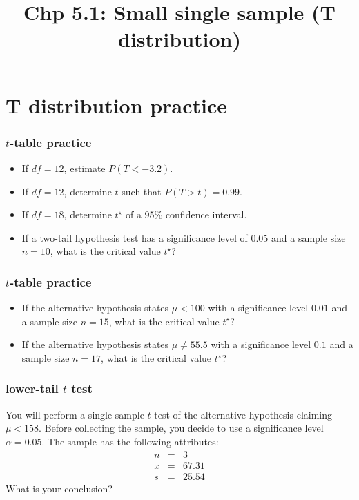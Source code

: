 \documentclass[11pt,containsverbatim,handout]{beamer}
\title[Chp 5.1: Small single sample (T distribution)]{Chp 5.1: Small single sample (T distribution)}
\newcommand{\soln}[1]{ }
\begin{document}
\section{T distribution practice}
\begin{frame}
\frametitle{$t$-table practice}
\begin{itemize}
\item If $df=12$, estimate $P(T<-3.2)$.\pause
\soln{$$0.0025 ~~<~~ P(T<-3.2) ~~<~~ 0.005$$} \pause
\vfill
\item If $df=12$, determine $t$ such that $P(T>t)=0.99$.\pause
\soln{$$t = -2.68$$} \pause
\vfill
\item If $df=18$, determine $t^\star$ of a 95\% confidence interval.\pause
\soln{$$t^\star = 2.10$$} \pause
\vfill
\item If a two-tail hypothesis test has a significance level of 0.05 and a sample size $n=10$, what is the critical value $t^\star$?\pause
\soln{$$t^\star = 2.26$$}
\vfill
\end{itemize}
\end{frame}

\begin{frame}
\frametitle{$t$-table practice}
\begin{itemize}
\item If the alternative hypothesis states $\mu<100$ with a significance level $0.01$ and a sample size $n=15$, what is the critical value $t^\star$?\pause
\soln{$$t^\star = -2.62$$
An observed test statistic $t_\text{obs}$ less than $-2.62$ will cause us to reject the null.
} \pause
\vfill
\item If the alternative hypothesis states $\mu\ne 55.5$ with a significance level $0.1$ and a sample size $n=17$, what is the critical value $t^\star$?\pause
\soln{$$t^\star = 1.75$$
or, maybe, depending on how you think about it, 
$$t^\star = \pm 1.75$$ \pause
An observed test statistic $t_\text{obs}$ less than $-1.75$ or more than $1.75$ will cause us to reject the null.}
\vfill
\end{itemize}
\end{frame}


\begin{frame}
\frametitle{lower-tail $t$ test}
You will perform a single-sample \(t\) test of the alternative
hypothesis claiming \(\mu<158\). Before collecting the sample, you decide to use a significance level \(\alpha = 0.05\). The sample has the following attributes: \[\begin{aligned}
n &=& 3 \\
\bar{x} &=& 67.31 \\
s &=& 25.54
\end{aligned}\] What is your conclusion?
\end{frame}
\end{document}
